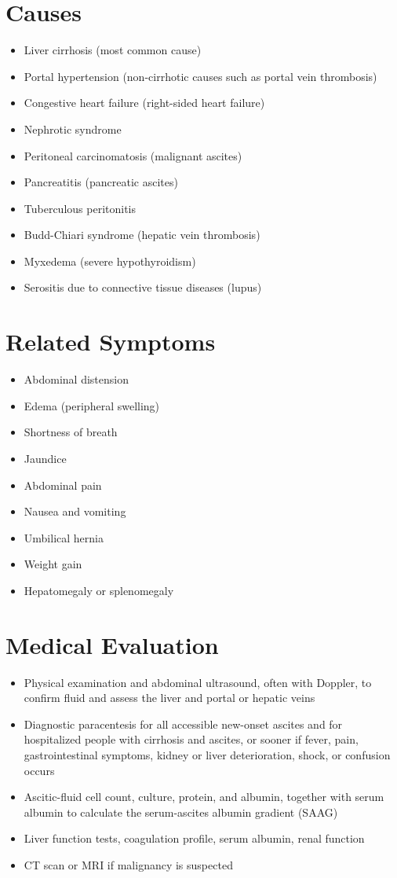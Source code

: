 \section*{Causes}
\begin{itemize}
\item Liver cirrhosis (most common cause)
\item Portal hypertension (non-cirrhotic causes such as portal vein thrombosis)
\item Congestive heart failure (right-sided heart failure)
\item Nephrotic syndrome
\item Peritoneal carcinomatosis (malignant ascites)
\item Pancreatitis (pancreatic ascites)
\item Tuberculous peritonitis
\item Budd-Chiari syndrome (hepatic vein thrombosis)
\item Myxedema (severe hypothyroidism)
\item Serositis due to connective tissue diseases (lupus)
\end{itemize}

\section*{Related Symptoms}
\begin{itemize}
\item Abdominal distension
\item Edema (peripheral swelling)
\item Shortness of breath
\item Jaundice
\item Abdominal pain
\item Nausea and vomiting
\item Umbilical hernia
\item Weight gain
\item Hepatomegaly or splenomegaly
\end{itemize}

\section*{Medical Evaluation}
\begin{itemize}
\item Physical examination and abdominal ultrasound, often with Doppler, to confirm fluid and assess the liver and portal or hepatic veins
\item Diagnostic paracentesis for all accessible new-onset ascites and for hospitalized people with cirrhosis and ascites, or sooner if fever, pain, gastrointestinal symptoms, kidney or liver deterioration, shock, or confusion occurs
\item Ascitic-fluid cell count, culture, protein, and albumin, together with serum albumin to calculate the serum-ascites albumin gradient (SAAG)
\item Liver function tests, coagulation profile, serum albumin, renal function
\item CT scan or MRI if malignancy is suspected
\end{itemize}

